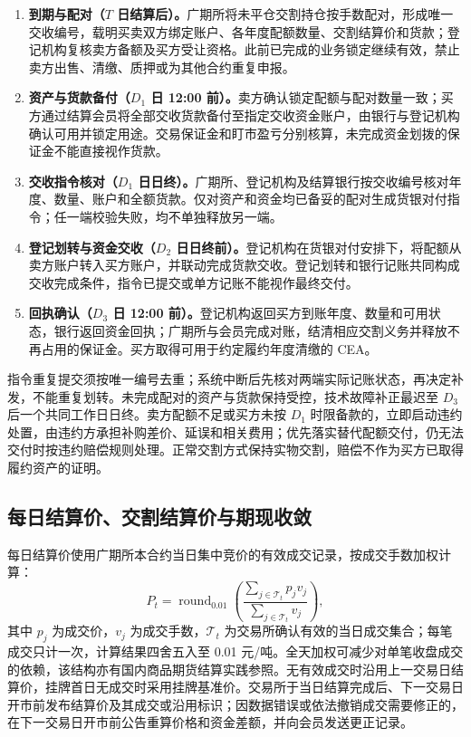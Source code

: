 \documentclass[UTF8,a4paper,11pt,oneside,fontset=fandol]{ctexart}
\begin{document}
\begin{enumerate}[leftmargin=2em,itemsep=0.35em]
\item \textbf{到期与配对（$T$ 日结算后）。}广期所将未平仓交割持仓按手数配对，形成唯一交收编号，载明买卖双方绑定账户、各年度配额数量、交割结算价和货款；登记机构复核卖方备额及买方受让资格。此前已完成的业务锁定继续有效，禁止卖方出售、清缴、质押或为其他合约重复申报。
\item \textbf{资产与货款备付（$D_1$ 日 12:00 前）。}卖方确认锁定配额与配对数量一致；买方通过结算会员将全部交收货款备付至指定交收资金账户，由银行与登记机构确认可用并锁定用途。交易保证金和盯市盈亏分别核算，未完成资金划拨的保证金不能直接视作货款。
\item \textbf{交收指令核对（$D_1$ 日日终）。}广期所、登记机构及结算银行按交收编号核对年度、数量、账户和全额货款。仅对资产和资金均已备妥的配对生成货银对付指令；任一端校验失败，均不单独释放另一端。
\item \textbf{登记划转与资金交收（$D_2$ 日日终前）。}登记机构在货银对付安排下，将配额从卖方账户转入买方账户，并联动完成货款交收。登记划转和银行记账共同构成交收完成条件，指令已提交或单方记账不能视作最终交付。
\item \textbf{回执确认（$D_3$ 日 12:00 前）。}登记机构返回买方到账年度、数量和可用状态，银行返回资金回执；广期所与会员完成对账，结清相应交割义务并释放不再占用的保证金。买方取得可用于约定履约年度清缴的 CEA。
\end{enumerate}

指令重复提交须按唯一编号去重；系统中断后先核对两端实际记账状态，再决定补发，不能重复划转。未完成配对的资产与货款保持受控，技术故障补正最迟至 $D_3$ 后一个共同工作日日终。卖方配额不足或买方未按 $D_1$ 时限备款的，立即启动违约处置，由违约方承担补购差价、延误和相关费用；优先落实替代配额交付，仍无法交付时按违约赔偿规则处理。正常交割方式保持实物交割，赔偿不作为买方已取得履约资产的证明。

\subsection{每日结算价、交割结算价与期现收敛}
每日结算价使用广期所本合约当日集中竞价的有效成交记录，按成交手数加权计算：
\[
 P_t=\operatorname{round}_{0.01}
 \left(\frac{\sum_{j\in\mathcal T_t}p_jv_j}{\sum_{j\in\mathcal T_t}v_j}\right),
\]
其中 $p_j$ 为成交价，$v_j$ 为成交手数，$\mathcal T_t$ 为交易所确认有效的当日成交集合；每笔成交只计一次，计算结果四舍五入至 0.01 元/吨。全天加权可减少对单笔收盘成交的依赖，该结构亦有国内商品期货结算实践参照\cite{csrc2013settlement}。无有效成交时沿用上一交易日结算价，挂牌首日无成交时采用挂牌基准价。交易所于当日结算完成后、下一交易日开市前发布结算价及其成交或沿用标识；因数据错误或依法撤销成交需要修正的，在下一交易日开市前公告重算价格和资金差额，并向会员发送更正记录。
\end{document}

